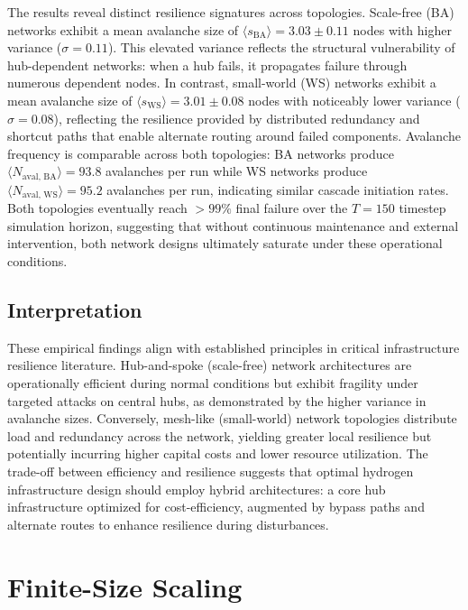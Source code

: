 \documentclass[12pt,a4paper,twoside]{report}
\begin{document}
The results reveal distinct resilience signatures across topologies. Scale-free (BA) networks exhibit a mean avalanche size of $\langle s_{\text{BA}} \rangle = 3.03 \pm 0.11$ nodes with higher variance ($\sigma = 0.11$). This elevated variance reflects the structural vulnerability of hub-dependent networks: when a hub fails, it propagates failure through numerous dependent nodes. In contrast, small-world (WS) networks exhibit a mean avalanche size of $\langle s_{\text{WS}} \rangle = 3.01 \pm 0.08$ nodes with noticeably lower variance ($\sigma = 0.08$), reflecting the resilience provided by distributed redundancy and shortcut paths that enable alternate routing around failed components. Avalanche frequency is comparable across both topologies: BA networks produce $\langle N_{\text{aval, BA}} \rangle = 93.8$ avalanches per run while WS networks produce $\langle N_{\text{aval, WS}} \rangle = 95.2$ avalanches per run, indicating similar cascade initiation rates. Both topologies eventually reach $>99\%$ final failure over the $T = 150$ timestep simulation horizon, suggesting that without continuous maintenance and external intervention, both network designs ultimately saturate under these operational conditions.

\subsection{Interpretation}

These empirical findings align with established principles in critical infrastructure resilience literature. Hub-and-spoke (scale-free) network architectures are operationally efficient during normal conditions but exhibit fragility under targeted attacks on central hubs, as demonstrated by the higher variance in avalanche sizes. Conversely, mesh-like (small-world) network topologies distribute load and redundancy across the network, yielding greater local resilience but potentially incurring higher capital costs and lower resource utilization. The trade-off between efficiency and resilience suggests that optimal hydrogen infrastructure design should employ hybrid architectures: a core hub infrastructure optimized for cost-efficiency, augmented by bypass paths and alternate routes to enhance resilience during disturbances.

\section{Finite-Size Scaling}
\end{document}
